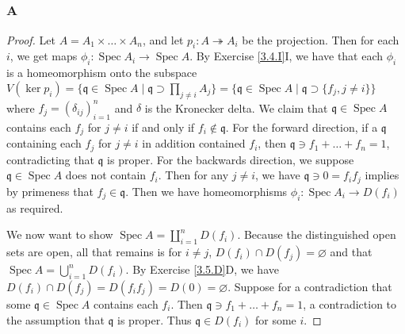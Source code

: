 \documentclass{article}
\newcommand{\frkq}{\mathfrak{q}}
\DeclareMathOperator{\Spec}{\mathrm{Spec}}
\let\emptyset\varnothing
\theoremstyle{definition} %
\begin{document}
\subsection{}
\subsubsection{A}\label{3.6.A}
\begin{proof}
    Let $A=A_1\times \dots \times A_n$, and let $p_i:A\twoheadrightarrow A_i$ be the projection. Then for each $i$, we get maps $\phi_i:\Spec A_i \to \Spec A$. By Exercise \ref{3.4.I}I, we have that each $\phi_i$ is a homeomorphism onto the subspace $V( \ker p_i) = \{\frkq \in \Spec A \mid \frkq \supset \prod_{j\ne i} A_j \}=\{\frkq \in \Spec A \mid \frkq \supset \{f_j, j\ne i\} \}$ where $f_j=(\delta_{ij})_{i=1}^n$ and $\delta$ is the Kronecker delta. We claim that $\frkq \in \Spec A$ contains each $f_j$ for $j\ne i$ if and only if $f_i \notin \frkq$. For the forward direction, if a $\frkq$ containing each $f_j$ for $j\ne i$ in addition contained $f_i$, then $\frkq \ni f_1+\dots+f_n =1$, contradicting that $\frkq$ is proper. For the backwards direction, we suppose $\frkq \in \Spec A$ does not contain $f_i$. Then for any $j\ne i$, we have $\frkq \ni 0 = f_i f_j$ implies by primeness that $f_j \in \frkq$. Then we have homeomorphisms $\phi_i:\Spec A_i\to D(f_i)$ as required.

    We now want to show $\Spec A = \coprod_{i=1}^n D(f_i)$. Because the distinguished open sets are open, all that remains is for $i\ne j$, $D(f_i)\cap D(f_j)=\emptyset$ and that $\Spec A = \bigcup_{i=1}^n D(f_i)$. By Exercise \ref{3.5.D}D, we have $D(f_i)\cap D(f_j)=D(f_if_j)=D(0)=\emptyset$. Suppose for a contradiction that some $\frkq \in \Spec A$ contains each $f_i$. Then $\frkq \ni f_1+\dots+f_n = 1$, a contradiction to the assumption that $\frkq$ is proper. Thus $\frkq \in D(f_i)$ for some $i$.
\end{proof}
\end{document}
